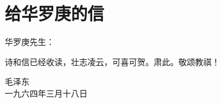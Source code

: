 \section[给华罗庚的信（一九六四年三月十八日）]{给华罗庚的信}


华罗庚先生：

诗和信已经收读，壮志凌云，可喜可贺。肃此。敬颂教祺！
{\raggedleft 毛泽东\\一九六四年三月十八日\par}


